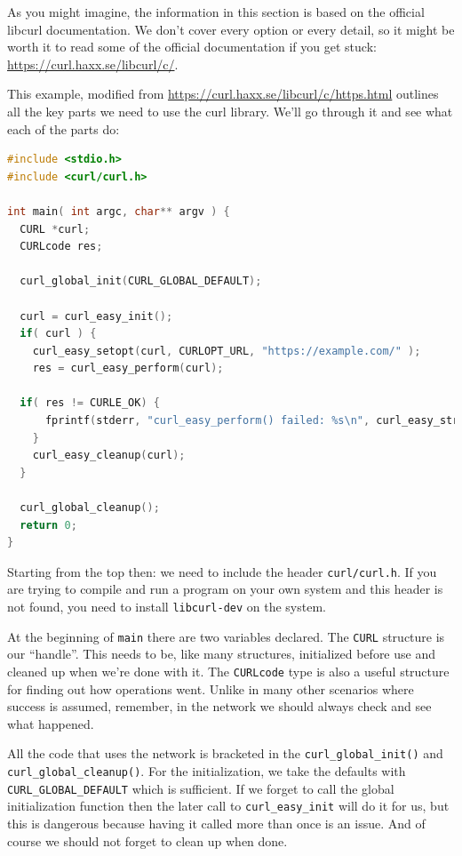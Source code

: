 \documentclass[a4paper]{report}
\begin{document}
As you might imagine, the information in this section is based on the official libcurl documentation. We don't cover every option or every detail, so it might be worth it to read some of the official documentation if you get stuck: \url{https://curl.haxx.se/libcurl/c/}.

This example, modified from \url{https://curl.haxx.se/libcurl/c/https.html} outlines all the key parts we need to use the curl library. We'll go through it and see what each of the parts do:

\begin{lstlisting}[language=C]
#include <stdio.h>
#include <curl/curl.h>
 
int main( int argc, char** argv ) {
  CURL *curl;
  CURLcode res;
 
  curl_global_init(CURL_GLOBAL_DEFAULT);
 
  curl = curl_easy_init();
  if( curl ) {
    curl_easy_setopt(curl, CURLOPT_URL, "https://example.com/" );
    res = curl_easy_perform(curl);
    
  if( res != CURLE_OK) {
      fprintf(stderr, "curl_easy_perform() failed: %s\n", curl_easy_strerror(res));
    }
    curl_easy_cleanup(curl);
  }
 
  curl_global_cleanup();
  return 0;
}
\end{lstlisting}

Starting from the top then: we need to include the header \texttt{curl/curl.h}. If you are trying to compile and run a program on your own system and this header is not found, you need to install \texttt{libcurl-dev} on the system.

At the beginning of \texttt{main} there are two variables declared. The \texttt{CURL} structure is our ``handle''. This needs to be, like many structures, initialized before use and cleaned up when we're done with it. The \texttt{CURLcode} type is also a useful structure for finding out how operations went. Unlike in many other scenarios where success is assumed, remember, in the network we should always check and see what happened.

All the code that uses the network is bracketed in the \texttt{curl\_global\_init()} and \texttt{curl\_global\_cleanup()}. For the initialization, we take the defaults with \texttt{CURL\_GLOBAL\_DEFAULT} which is sufficient. If we forget to call the global initialization function then the later call to \texttt{curl\_easy\_init} will do it for us, but this is dangerous because having it called more than once is an issue. And of course we should not forget to clean up when done.
\end{document}
